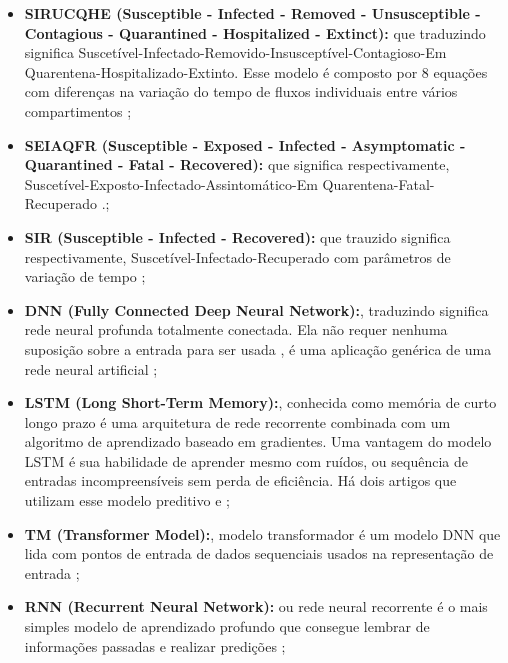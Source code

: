 \begin{itemize}
    \item \textbf{SIRUCQHE (Susceptible - Infected - Removed - Unsusceptible - Contagious - Quarantined - Hospitalized - Extinct):} que traduzindo significa Suscetível-Infectado-Removido-Insusceptível-Contagioso-Em Quarentena-Hospitalizado-Extinto. Esse modelo é composto por 8 equações com diferenças na variação do tempo de fluxos individuais entre vários compartimentos \cite{Scarabaggio};\\
    
    
    \item \textbf{SEIAQFR (Susceptible - Exposed - Infected - Asymptomatic - Quarantined - Fatal - Recovered):} que significa respectivamente, Suscetível-Exposto-Infectado-Assintomático-Em Quarentena-Fatal-Recuperado \cite{Rakshit}.;\\
    
    
    \item \textbf{SIR (Susceptible - Infected - Recovered):} que trauzido significa respectivamente, Suscetível-Infectado-Recuperado com parâmetros de variação de tempo \cite{Chinchilla};\\

    \item \textbf{DNN (Fully Connected Deep Neural Network):}, traduzindo significa rede neural profunda totalmente conectada. Ela não requer nenhuma suposição sobre a entrada para ser usada , é uma aplicação genérica de uma rede neural artificial \cite{Alkhammash};\\
    
    
    \item \textbf{LSTM (Long Short-Term Memory):}, conhecida como memória de curto longo prazo é uma arquitetura de rede recorrente combinada com um algoritmo de aprendizado baseado em gradientes. Uma vantagem do modelo LSTM é sua habilidade de aprender mesmo com ruídos, ou sequência de entradas incompreensíveis sem perda de eficiência. Há dois artigos que utilizam esse modelo preditivo \cite{Nikita} e \cite{Alkhammash} ;\\
    
    
    \item \textbf{TM (Transformer Model):}, modelo transformador é um modelo DNN que lida com pontos de entrada de dados sequenciais usados na representação de entrada \cite{Alkhammash};\\
    
    
    \item \textbf{RNN (Recurrent Neural Network):} ou rede neural recorrente é o mais simples modelo de aprendizado profundo que consegue lembrar de informações passadas e realizar predições \cite{Nikita};\\
    

\end{itemize}
